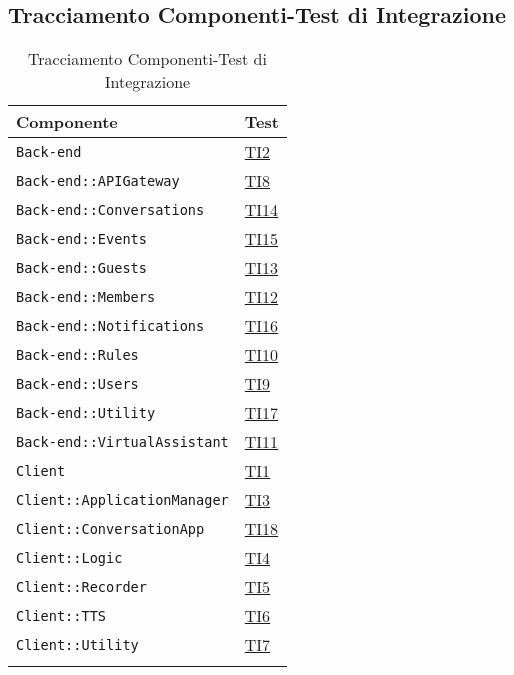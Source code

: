 \subsection{Tracciamento Componenti-Test di Integrazione}
\normalsize
\begin{longtable}{|>{\centering}m{9cm}|m{3cm}<{\centering}|}
\hline 
\textbf{Componente} & \textbf{Test}\\
\hline
\endhead
\texttt{Back-end} & \hyperlink{TI2}{TI2}\\ \hline
\texttt{Back-end::APIGateway} & \hyperlink{TI8}{TI8}\\ \hline
\texttt{Back-end::Conversations} & \hyperlink{TI14}{TI14}\\ \hline
\texttt{Back-end::Events} & \hyperlink{TI15}{TI15}\\ \hline
\texttt{Back-end::Guests} & \hyperlink{TI13}{TI13}\\ \hline
\texttt{Back-end::Members} & \hyperlink{TI12}{TI12}\\ \hline
\texttt{Back-end::Notifications} & \hyperlink{TI16}{TI16}\\ \hline
\texttt{Back-end::Rules} & \hyperlink{TI10}{TI10}\\ \hline
\texttt{Back-end::Users} & \hyperlink{TI9}{TI9}\\ \hline
\texttt{Back-end::Utility} & \hyperlink{TI17}{TI17}\\ \hline
\texttt{Back-end::VirtualAssistant} & \hyperlink{TI11}{TI11}\\ \hline
\texttt{Client} & \hyperlink{TI1}{TI1}\\ \hline
\texttt{Client::ApplicationManager} & \hyperlink{TI3}{TI3}\\ \hline
\texttt{Client::ConversationApp} & \hyperlink{TI18}{TI18}\\ \hline
\texttt{Client::Logic} & \hyperlink{TI4}{TI4}\\ \hline
\texttt{Client::Recorder} & \hyperlink{TI5}{TI5}\\ \hline
\texttt{Client::TTS} & \hyperlink{TI6}{TI6}\\ \hline
\texttt{Client::Utility} & \hyperlink{TI7}{TI7}\\ \hline
\caption[Tracciamento Componenti-Test di Integrazione]{Tracciamento Componenti-Test di Integrazione}
\label{tabella:pkg-ti}
\end{longtable}
\clearpage
